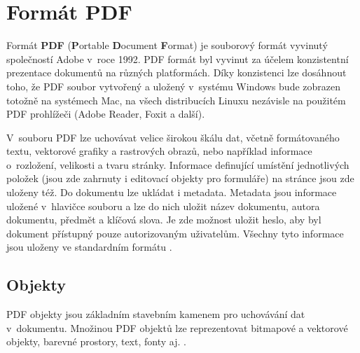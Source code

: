 \chapter{Formát PDF}
Formát \textbf{PDF} (\textbf{P}ortable \textbf{D}ocument \textbf{F}ormat) je souborový formát vyvinutý společností Adobe v~roce 1992. PDF formát byl vyvinut za účelem konzistentní prezentace dokumentů na různých platformách. Díky konzistenci lze dosáhnout toho, že PDF soubor vytvořený a uložený v~systému Windows bude zobrazen totožně na systémech Mac, na všech distribucích Linuxu nezávisle na použitém PDF prohlížeči (Adobe Reader, Foxit a další).
\par 
V~souboru PDF lze uchovávat velice širokou škálu dat, včetně formátovaného textu, vektorové grafiky a rastrových obrazů, nebo například informace o~rozložení, velikosti a tvaru stránky. Informace definující umístění jednotlivých položek (jsou zde zahrnuty i editovací objekty pro formuláře) na stránce jsou zde uloženy též. Do dokumentu lze ukládat i metadata. Metadata jsou informace uložené v~hlavičce souboru a lze do nich uložit název dokumentu, autora dokumentu, předmět a klíčová slova. Je zde možnost uložit heslo, aby byl dokument přístupný pouze autorizovaným uživatelům. Všechny tyto informace jsou uloženy ve standardním formátu \cite{PDFTechTerms, PDFWhatIs}.

\section{Objekty}
PDF objekty jsou základním stavebním kamenem pro uchovávání dat v~dokumentu. Množinou PDF objektů lze reprezentovat bitmapové a vektorové objekty, barevné prostory, text, fonty aj. \cite{PDFExplained}.
